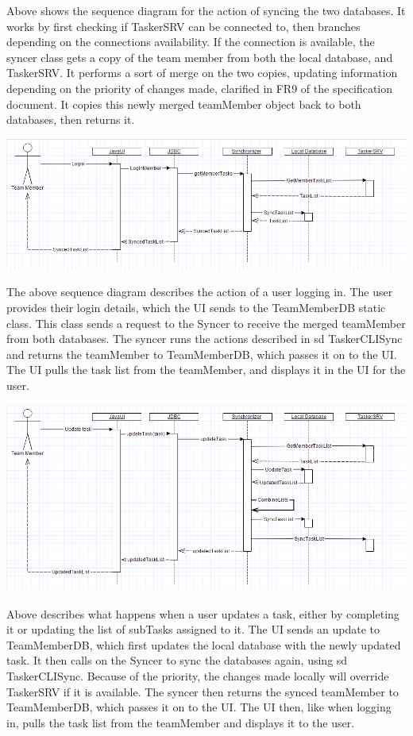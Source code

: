 \documentclass{project}
\begin{document}
Above shows the sequence diagram for the action of syncing the two databases. It works by first checking if TaskerSRV can be connected to,
then branches depending on the connections availability.
If the connection is available, the syncer class gets a copy of the team member from both the local database, and TaskerSRV. It performs
a sort of merge on the two copies, updating information depending on the priority of changes made, clarified in FR9 of the specification document.
It copies this newly merged teamMember object back to both databases, then returns it.

\includegraphics[width=1\textwidth, center]{images/Detailed-Design/TaskerCLISequenceDiagramLogin} 

The above sequence diagram describes the action of a user logging in. The user provides their login details, which the UI sends to
the TeamMemberDB static class. This class sends a request to the Syncer to receive the merged teamMember from both databases.
The syncer runs the actions described in sd TaskerCLI\textunderscore Sync and returns the teamMember to TeamMemberDB, which passes it on to the
UI. The UI pulls the task list from the teamMember, and displays it in the UI for the user.

\includegraphics[width=1\textwidth, center]{images/Detailed-Design/TaskerCLISequenceDiagramUpdateTask} 

Above describes what happens when a user updates a task, either by completing it or updating the list of subTasks assigned to it.
The UI sends an update to TeamMemberDB, which first updates the local database with the newly updated task. It then calls on the Syncer
to sync the databases again, using sd TaskerCLI\textunderscore Sync. Because of the priority, the changes made locally will override TaskerSRV if it is available.
The syncer then returns the synced teamMember to TeamMemberDB, which passes it on to the UI. The UI then, like when logging in,
pulls the task list from the teamMember and displays it to the user.
\end{document}

